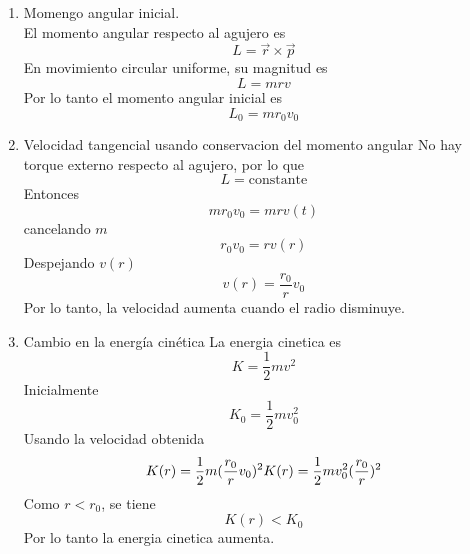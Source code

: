 \documentclass[12pt,a4paper]{article}
\begin{document}
    \begin{solucion}
        \begin{enumerate}
            \item[(a)] Momengo angular inicial.\\
            El momento angular respecto al agujero es
            \begin{equation*}
                L=\vec{r}\times\vec{p}
            \end{equation*}
            En movimiento circular uniforme, su magnitud es
            \begin{equation*}
                L=mrv
            \end{equation*}
            Por lo tanto el momento angular inicial es
            \begin{equation*}
                L_{0}=mr_{0}v_{0}
            \end{equation*}
            \item[(b)] Velocidad tangencial usando conservacion del momento angular
            No hay torque externo respecto al agujero, por lo que
            \begin{equation*}
                L=\text{constante}
            \end{equation*}
            Entonces
            \begin{equation*}
                mr_{0}v_{0}=mrv(t)
            \end{equation*}
            cancelando $m$
            \begin{equation*}
                r_{0}v_{0}=rv(r)
            \end{equation*}
            Despejando $v(r)$
            \begin{equation*}
                v(r)=\frac{r_{0}}{r}v_{0}
            \end{equation*}
            Por lo tanto, la velocidad aumenta cuando el radio disminuye.
            \item[(c)] Cambio en la energía cinética
            La energia cinetica es
            \begin{equation*}
                K=\frac{1}{2}mv^{2}
            \end{equation*}
            Inicialmente
            \begin{equation*}
                K_{0}=\frac{1}{2}mv_{0}^{2}
            \end{equation*}
            Usando la velocidad obtenida
            \begin{equation*}
                K(r)=\frac{1}{2}m(\frac{r_{0}}{r}v_{0})^{2}\\
                K(r)=\frac{1}{2}mv_{0}^{2}(\frac{r_{0}}{r})^{2}
            \end{equation*}
            Como $r\lt r_{0}$, se tiene
            \begin{equation*}
                K(r)\lt K_{0}
            \end{equation*}
            Por lo tanto la energia cinetica aumenta.
        \end{enumerate}
    \end{solucion}
\end{document}
